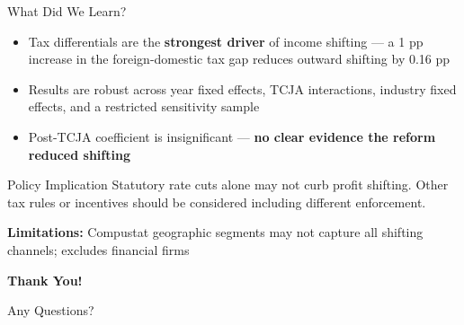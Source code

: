 \documentclass{beamer}
\begin{document}
\begin{frame}{What Did We Learn?}
\begin{itemize}
    \item Tax differentials are the \textbf{strongest driver} of income shifting --- a 1 pp increase in the foreign-domestic tax gap reduces outward shifting by 0.16 pp
    \item Results are robust across year fixed effects, TCJA interactions, industry fixed effects, and a restricted sensitivity sample
    \item Post-TCJA coefficient is insignificant --- \textbf{no clear evidence the reform reduced shifting}
\end{itemize}

\vspace{0.3cm}
\begin{block}{Policy Implication}
Statutory rate cuts alone may not curb profit shifting. Other tax rules or incentives should be considered including different enforcement.
\end{block}

\vspace{0.2cm}
\textbf{Limitations:} Compustat geographic segments may not capture all shifting channels; excludes financial firms
\end{frame}

\begin{frame}
\centering
\vspace{1.5cm}
{\Huge\textbf{Thank You!}}

\vspace{1cm}
{\Large Any Questions?}
\end{frame}
\end{document}
